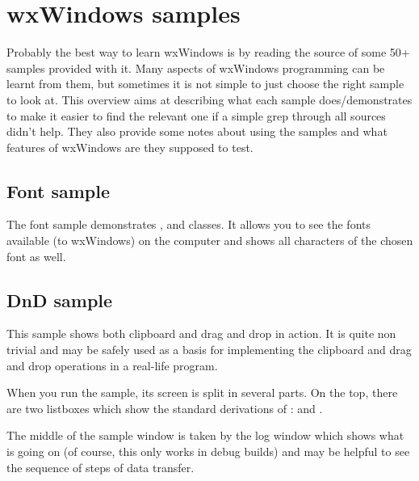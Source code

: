 
\section{wxWindows samples}\label{samples}

Probably the best way to learn wxWindows is by reading the source of some 50+
samples provided with it. Many aspects of wxWindows programming can be learnt
from them, but sometimes it is not simple to just choose the right sample to
look at. This overview aims at describing what each sample does/demonstrates to
make it easier to find the relevant one if a simple grep through all sources
didn't help. They also provide some notes about using the samples and what
features of wxWindows are they supposed to test.

\subsection{Font sample}\label{samplefont}

The font sample demonstrates , 
 and 
 classes. It allows you to see the fonts
available (to wxWindows) on the computer and shows all characters of the
chosen font as well.

\subsection{DnD sample}\label{samplednd}

This sample shows both clipboard and drag and drop in action. It is quite non
trivial and may be safely used as a basis for implementing the clipboard and
drag and drop operations in a real-life program.

When you run the sample, its screen is split in several parts. On the top,
there are two listboxes which show the standard derivations of 
: 
 and 
.

The middle of the sample window is taken by the log window which shows what is
going on (of course, this only works in debug builds) and may be helpful to see
the sequence of steps of data transfer.

